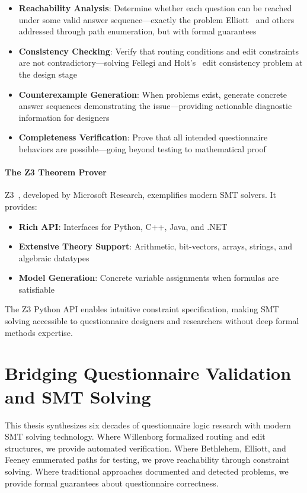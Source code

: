 \begin{itemize}
    \item \textbf{Reachability Analysis}: Determine whether each question can be reached under some valid answer sequence—exactly the problem Elliott~\cite{elliott2012application} and others addressed through path enumeration, but with formal guarantees
    \item \textbf{Consistency Checking}: Verify that routing conditions and edit constraints are not contradictory—solving Fellegi and Holt's~\cite{fellegi1976systematic} edit consistency problem at the design stage
    \item \textbf{Counterexample Generation}: When problems exist, generate concrete answer sequences demonstrating the issue—providing actionable diagnostic information for designers
    \item \textbf{Completeness Verification}: Prove that all intended questionnaire behaviors are possible—going beyond testing to mathematical proof
\end{itemize}

\paragraph{The Z3 Theorem Prover}

Z3~\cite{demoura2008z3}, developed by Microsoft Research, exemplifies modern SMT solvers. It provides:

\begin{itemize}
    \item \textbf{Rich API}: Interfaces for Python, C++, Java, and .NET
    \item \textbf{Extensive Theory Support}: Arithmetic, bit-vectors, arrays, strings, and algebraic datatypes
    \item \textbf{Model Generation}: Concrete variable assignments when formulas are satisfiable
\end{itemize}

The Z3 Python API enables intuitive constraint specification, making SMT solving accessible to questionnaire designers and researchers without deep formal methods expertise.

\section{Bridging Questionnaire Validation and SMT Solving}

This thesis synthesizes six decades of questionnaire logic research with modern SMT solving technology. Where Willenborg formalized routing and edit structures, we provide automated verification. Where Bethlehem, Elliott, and Feeney enumerated paths for testing, we prove reachability through constraint solving. Where traditional approaches documented and detected problems, we provide formal guarantees about questionnaire correctness.

